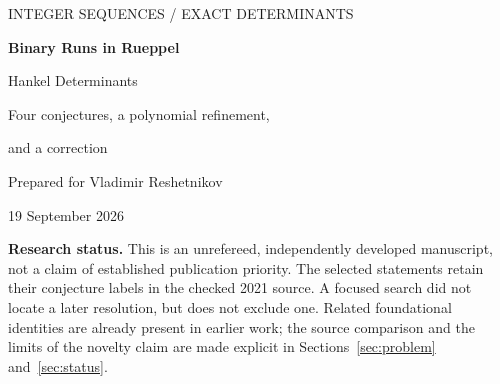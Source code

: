 \documentclass[11pt,a4paper]{article}
\numberwithin{equation}{section}
\theoremstyle{definition}
\theoremstyle{remark}
\newcommand{\Runs}{\mathcal R}
\newcommand{\eps}{\varepsilon}
\begin{document}
\hypersetup{pageanchor=false}
\begin{titlepage}
\vspace*{12mm}
{\sffamily\color{Accent}\large INTEGER SEQUENCES \enspace / \enspace EXACT DETERMINANTS\par}
\vspace{9mm}
{\sffamily\bfseries\color{Ink}\fontsize{28}{33}\selectfont
Binary Runs in Rueppel\par Hankel Determinants\par}
\vspace{6mm}
{\sffamily\large\color{Muted}Four conjectures, a polynomial refinement,\par and a correction\par}
\vspace{12mm}
{\large Prepared for Vladimir Reshetnikov\par}
{\color{Muted}19 September 2026\par}
\vspace{12mm}
\begin{abstract}
Let $r(x)=\sum_{j\ge0}x^{2^j-1}$, and let $H_n(f)$ denote the Hankel
determinant of order $n$ of the coefficients of $f$. We determine, as a
polynomial in $t$, every determinant of
\[
 f_t(x)=t x+\frac{1}{r(x^2)}.
\]
If $\Runs(n)$ is the number of binary runs of $n$ and $\eps(n)$ is the lowest
bit of its binary reflected Gray code, the answer is
\[
 H_n(f_t)=(-1)^{1+\eps(n)+\lfloor\Runs(n)/2\rfloor}
 \bigl(\eps(n)+(\Runs(n)-\eps(n))t^2\bigr),\qquad n\ge1.
\]
In particular, $|H_n(f_1)|=\Runs(n)$. Together with reciprocal-minor and
parity-block identities, this proves the statements numbered 8, 10, 13,
and 23 in Paul Barry's 2021 note on generalized Rueppel sequences.
We also classify all exceptional complex parameters, compute exact
signed distributions and dyadic sums, and give a counterexample to
Conjecture 22 as printed, with a valid signed replacement.
The proofs are algebraic and apply to every index. An accompanying
standard-library Python implementation independently checks 1,192
Rueppel-related determinants and supplies reproducible data.
\end{abstract}
\vfill
\begin{resultbox}
\small
\textbf{Research status.} This is an unrefereed, independently developed
manuscript, not a claim of established publication priority. The selected
statements retain their conjecture labels in the checked 2021 source.
A focused search did not locate a later resolution, but does not exclude
one. Related foundational identities are already present in earlier
work; the source comparison and the limits of the novelty claim are
made explicit in Sections~\ref{sec:problem} and~\ref{sec:status}.
\end{resultbox}
\end{titlepage}
\hypersetup{pageanchor=true}
\tableofcontents
\newpage
{}
\end{document}
